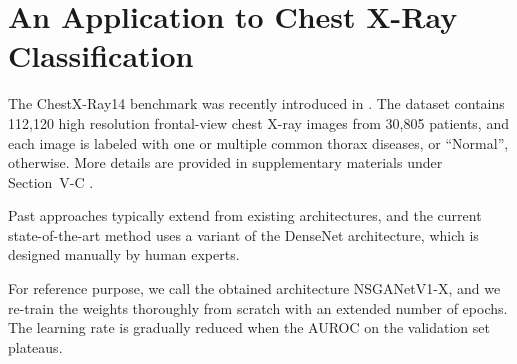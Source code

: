 \documentclass[journal]{IEEEtran}
\def\ourmethod{NSGANetV1}
\theoremstyle{definition}
\theoremstyle{remark}
\begin{document}
 \section{An Application to Chest X-Ray Classification
\label{sec:appl}}
The ChestX-Ray14 benchmark was recently introduced in \cite{wang2017chestx}. The dataset contains 112,120 high resolution frontal-view chest X-ray images from 30,805 patients, and each image is labeled with one or multiple common thorax diseases, or ``Normal'', otherwise. More details are provided in supplementary materials under Section~V-C .
\begin{comment}
To cope with the multi-label nature of the dataset, we use a multitask learning setup in which each disease is treated as an individual binary classification problem. We define a 14-dimensional label vector of binary values indicating the presence of one or more diseases, resulting in a regression loss as opposed to the standard cross-entropy for single-label problems.
\end{comment}
Past approaches \cite{wang2017chestx,yao2017learning,rajpurkar2017chexnet} typically extend from existing architectures, and the current state-of-the-art method \cite{rajpurkar2017chexnet} uses a variant of the DenseNet \cite{densenet} architecture, which is designed manually by human experts.
\begin{comment}
The search is set up along the same lines as that of CIFAR-100 described in Section~\ref{sec:exp}, except that the classification accuracy objective is replaced by the average area under the ROC curve (AUROC) metric to guide the selection of architectures. We split the dataset into three parts with 70\% for training, 10\% for validation, and the remaining 20\% for testing.
All images are pre-processed to 224224 pixels using ImageNet data augmentation techniques (e.g., normalization, random horizontal flipping, etc.).
Once the non-dominated architectures are obtained after the convergence of evolution, we select the architecture that maximizes the ratio between the gain in AUROC over the sacrifice in FLOPs.
\end{comment}
For reference purpose, we call the obtained architecture \ourmethod{}-X, and we re-train the weights thoroughly from scratch with an extended number of epochs. The learning rate is gradually reduced when the AUROC on the validation set plateaus.
\end{document}
